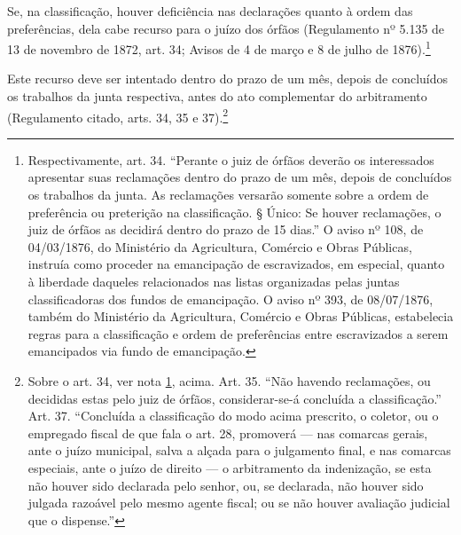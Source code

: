 Se, na classificação, houver deficiência nas declarações quanto à ordem
das preferências, dela cabe recurso para o juízo dos órfãos (Regulamento
nº 5.135 de 13 de novembro de 1872, art. 34; Avisos de 4 de março e 8 de
julho de 1876).\footnote{Respectivamente, art. 34. ``Perante o juiz de \label{art34}
  órfãos deverão os interessados apresentar suas reclamações dentro do
  prazo de um mês, depois de concluídos os trabalhos da junta. As
  reclamações versarão somente sobre a ordem de preferência ou
  preterição na classificação. § Único: Se houver reclamações, o juiz de
  órfãos as decidirá dentro do prazo de 15 dias.'' O aviso nº 108, de
  04/03/1876, do Ministério da Agricultura, Comércio e Obras Públicas,
  instruía como proceder na emancipação de escravizados, em especial,
  quanto à liberdade daqueles relacionados nas listas organizadas pelas
  juntas classificadoras dos fundos de emancipação. O aviso nº 393, de
  08/07/1876, também do Ministério da Agricultura, Comércio e Obras
  Públicas, estabelecia regras para a classificação e ordem de
  preferências entre escravizados a serem emancipados via fundo de
  emancipação.}

Este recurso deve ser intentado dentro do prazo de um mês, depois de
concluídos os trabalhos da junta respectiva, antes do ato complementar
do arbitramento (Regulamento citado, arts. 34, 35 e 37).\footnote{
  Sobre o art. 34, ver nota \ref{art34}, acima. Art. 35. ``Não havendo reclamações, ou
  decididas estas pelo juiz de órfãos, considerar-se-á concluída a
  classificação.'' Art. 37. ``Concluída a classificação do modo acima
  prescrito, o coletor, ou o empregado fiscal de que fala o art. 28,
  promoverá --- nas comarcas gerais, ante o juízo municipal, salva a
  alçada para o julgamento final, e nas comarcas especiais, ante o juízo
  de direito --- o arbitramento da indenização, se esta não houver sido
  declarada pelo senhor, ou, se declarada, não houver sido julgada
  razoável pelo mesmo agente fiscal; ou se não houver avaliação judicial
  que o dispense.''}

